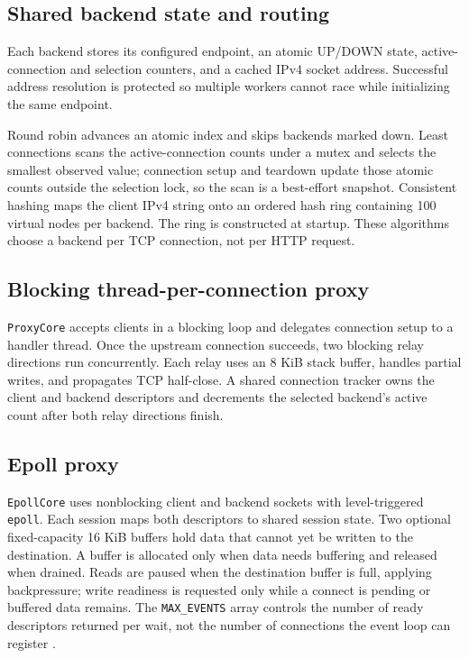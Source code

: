 \documentclass[conference]{IEEEtran}
\begin{document}
\subsection{Shared backend state and routing}
Each backend stores its configured endpoint, an atomic UP/DOWN state, active-connection and selection counters, and a cached IPv4 socket address. Successful address resolution is protected so multiple workers cannot race while initializing the same endpoint.

Round robin advances an atomic index and skips backends marked down. Least connections scans the active-connection counts under a mutex and selects the smallest observed value; connection setup and teardown update those atomic counts outside the selection lock, so the scan is a best-effort snapshot. Consistent hashing maps the client IPv4 string onto an ordered hash ring containing 100 virtual nodes per backend. The ring is constructed at startup. These algorithms choose a backend per TCP connection, not per HTTP request.

\subsection{Blocking thread-per-connection proxy}
\texttt{ProxyCore} accepts clients in a blocking loop and delegates connection setup to a handler thread. Once the upstream connection succeeds, two blocking relay directions run concurrently. Each relay uses an 8 KiB stack buffer, handles partial writes, and propagates TCP half-close. A shared connection tracker owns the client and backend descriptors and decrements the selected backend's active count after both relay directions finish.

\subsection{Epoll proxy}
\texttt{EpollCore} uses nonblocking client and backend sockets with level-triggered \texttt{epoll}. Each session maps both descriptors to shared session state. Two optional fixed-capacity 16 KiB buffers hold data that cannot yet be written to the destination. A buffer is allocated only when data needs buffering and released when drained. Reads are paused when the destination buffer is full, applying backpressure; write readiness is requested only while a connect is pending or buffered data remains. The \texttt{MAX\_EVENTS} array controls the number of ready descriptors returned per wait, not the number of connections the event loop can register \cite{epollman}.
\end{document}
